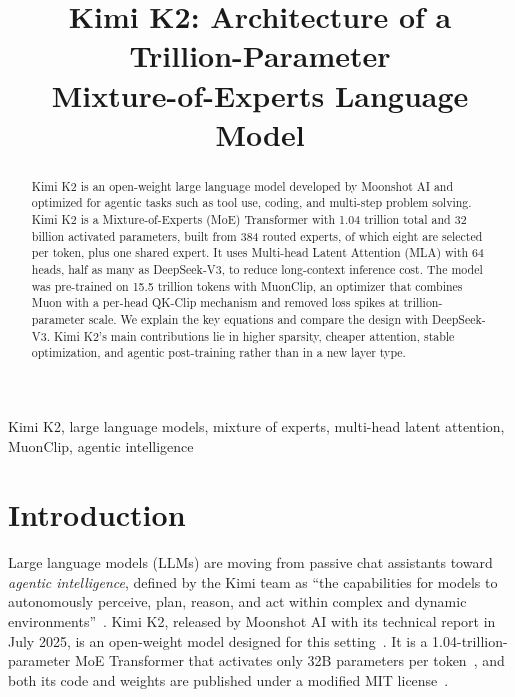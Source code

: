 \documentclass[conference]{IEEEtran}
\begin{document}
\title{Kimi K2: Architecture of a Trillion-Parameter\\Mixture-of-Experts Language Model}

\author{
}

\maketitle

\begin{abstract}
Kimi K2 is an open-weight large language model developed by Moonshot AI and optimized for agentic tasks such as tool use, coding, and multi-step problem solving. Kimi K2 is a Mixture-of-Experts (MoE) Transformer with 1.04 trillion total and 32 billion activated parameters, built from 384 routed experts, of which eight are selected per token, plus one shared expert. It uses Multi-head Latent Attention (MLA) with 64 heads, half as many as DeepSeek-V3, to reduce long-context inference cost. The model was pre-trained on 15.5 trillion tokens with MuonClip, an optimizer that combines Muon with a per-head QK-Clip mechanism and removed loss spikes at trillion-parameter scale. We explain the key equations and compare the design with DeepSeek-V3. Kimi K2's main contributions lie in higher sparsity, cheaper attention, stable optimization, and agentic post-training rather than in a new layer type.
\end{abstract}

\begin{IEEEkeywords}
Kimi K2, large language models, mixture of experts, multi-head latent attention, MuonClip, agentic intelligence
\end{IEEEkeywords}

\section{Introduction}
Large language models (LLMs) are moving from passive chat assistants toward \emph{agentic intelligence}, defined by the Kimi team as ``the capabilities for models to autonomously perceive, plan, reason, and act within complex and dynamic environments''~\cite{kimik2}. Kimi K2, released by Moonshot AI with its technical report in July 2025, is an open-weight model designed for this setting~\cite{kimik2,kimik2github}. It is a 1.04-trillion-parameter MoE Transformer that activates only 32B parameters per token~\cite{kimik2}, and both its code and weights are published under a modified MIT license~\cite{kimik2github}.
\end{document}
